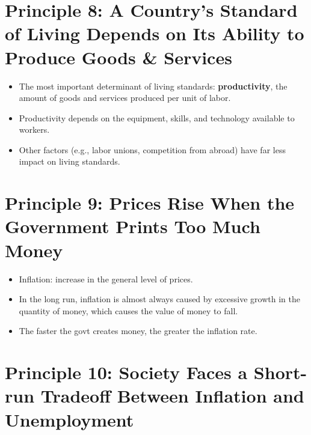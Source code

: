 \documentclass[
]{book}
\providecommand{\tightlist}{%
  \setlength{\itemsep}{0pt}\setlength{\parskip}{0pt}}
\begin{document}
\hypertarget{principle-8-a-countrys-standard-of-living-depends-on-its-ability-to-produce-goods-services}{%
\section{Principle 8: A Country's Standard of Living Depends on Its Ability to Produce Goods \& Services}\label{principle-8-a-countrys-standard-of-living-depends-on-its-ability-to-produce-goods-services}}

\begin{itemize}
\tightlist
\item
  The most important determinant of living standards: \textbf{productivity}, the amount of goods and services produced per unit of labor.
\item
  Productivity depends on the equipment, skills, and technology available to workers.
\item
  Other factors (e.g., labor unions, competition from abroad) have far less impact on living standards.
\end{itemize}

\hypertarget{principle-9-prices-rise-when-the-government-prints-too-much-money}{%
\section{Principle 9: Prices Rise When the Government Prints Too Much Money}\label{principle-9-prices-rise-when-the-government-prints-too-much-money}}

\begin{itemize}
\tightlist
\item
  Inflation: increase in the general level of prices.
\item
  In the long run, inflation is almost always caused by excessive growth in the quantity of money, which causes the value of money to fall.
\item
  The faster the govt creates money, the greater the inflation rate.
\end{itemize}

\hypertarget{principle-10-society-faces-a-short-run-tradeoff-between-inflation-and-unemployment}{%
\section{Principle 10: Society Faces a Short-run Tradeoff Between Inflation and Unemployment}\label{principle-10-society-faces-a-short-run-tradeoff-between-inflation-and-unemployment}}
\end{document}
